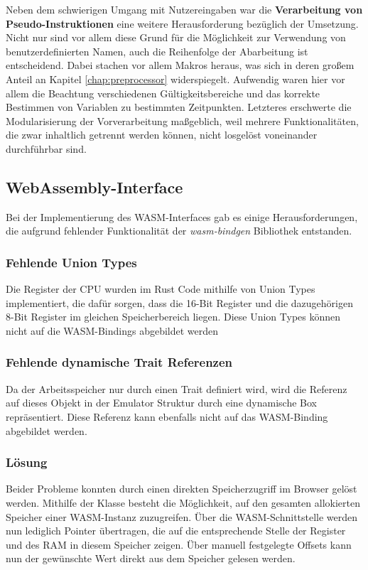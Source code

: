 Neben dem schwierigen Umgang mit Nutzereingaben war die \textbf{Verarbeitung von Pseudo-Instruktionen} eine weitere Herausforderung bezüglich der Umsetzung. Nicht nur sind vor allem diese Grund für die Möglichkeit zur Verwendung von benutzerdefinierten Namen, auch die Reihenfolge der Abarbeitung ist entscheidend. Dabei stachen vor allem Makros heraus, was sich in deren großem Anteil an Kapitel \ref{chap:preprocessor} widerspiegelt. Aufwendig waren hier vor allem die Beachtung verschiedenen Gültigkeitsbereiche und das korrekte Bestimmen von Variablen zu bestimmten Zeitpunkten. Letzteres erschwerte die Modularisierung der Vorverarbeitung maßgeblich, weil mehrere Funktionalitäten, die zwar inhaltlich getrennt werden können, nicht losgelöst voneinander durchführbar sind.

\subsection{WebAssembly-Interface}

Bei der Implementierung des \ac{WASM}-Interfaces gab es einige Herausforderungen, die aufgrund fehlender Funktionalität der \textit{wasm-bindgen} Bibliothek entstanden. 

\subsubsection*{Fehlende Union Types}

Die Register der \ac{CPU} wurden im Rust Code mithilfe von Union Types implementiert, die dafür sorgen, dass die 16-Bit Register und die dazugehörigen 8-Bit Register im gleichen Speicherbereich liegen. Diese Union Types können nicht auf die \ac{WASM}-Bindings abgebildet werden

\subsubsection*{Fehlende dynamische Trait Referenzen}

Da der Arbeitsspeicher nur durch einen Trait definiert wird, wird die Referenz auf dieses Objekt in der Emulator Struktur durch eine dynamische Box repräsentiert. Diese Referenz kann ebenfalls nicht auf das \ac{WASM}-Binding abgebildet werden.

\subsubsection*{Lösung}

Beider Probleme konnten durch einen direkten Speicherzugriff im Browser gelöst werden. Mithilfe der  Klasse besteht die Möglichkeit, auf den gesamten allokierten Speicher einer \ac{WASM}-Instanz zuzugreifen. Über die \ac{WASM}-Schnittstelle werden nun lediglich Pointer übertragen, die auf die entsprechende Stelle der Register und des \ac{RAM} in diesem Speicher zeigen. Über manuell festgelegte Offsets kann nun der gewünschte Wert direkt aus dem Speicher gelesen werden.



